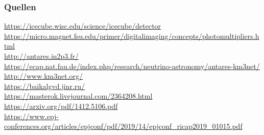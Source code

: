 \documentclass[aspectratio=1610, 9pt]{beamer}
\begin{document}
\begin{frame}\frametitle{Quellen}
\url{https://icecube.wisc.edu/science/icecube/detector} \\
\url{https://micro.magnet.fsu.edu/primer/digitalimaging/concepts/photomultipliers.html} \\
\url{http://antares.in2p3.fr/} \\
\url{https://ecap.nat.fau.de/index.php/research/neutrino-astronomy/antares-km3net/} \\
\url{http://www.km3net.org/} \\
\url{https://baikalgvd.jinr.ru/} \\
\url{https://masterok.livejournal.com/2364208.html} \\
\url{https://arxiv.org/pdf/1412.5106.pdf} \\
\url{https://www.epj-conferences.org/articles/epjconf/pdf/2019/14/epjconf_ricap2019_01015.pdf} \\

\end{frame}
\end{document}
